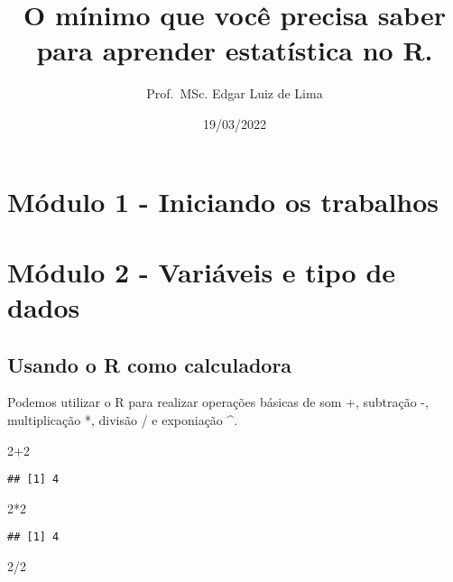 \documentclass[
]{article}
\title{O mínimo que você precisa saber para aprender estatística no R.}
\author{Prof.~MSc. Edgar Luiz de Lima}
\date{19/03/2022}
\newenvironment{Shaded}{\begin{snugshade}}{\end{snugshade}}
\newcommand{\DecValTok}[1]{\textcolor[rgb]{0.00,0.00,0.81}{#1}}
\newcommand{\SpecialCharTok}[1]{\textcolor[rgb]{0.00,0.00,0.00}{#1}}
\begin{document}
\maketitle

\hypertarget{muxf3dulo-1---iniciando-os-trabalhos}{%
\section{Módulo 1 - Iniciando os
trabalhos}\label{muxf3dulo-1---iniciando-os-trabalhos}}

\hypertarget{muxf3dulo-2---variuxe1veis-e-tipo-de-dados}{%
\section{Módulo 2 - Variáveis e tipo de
dados}\label{muxf3dulo-2---variuxe1veis-e-tipo-de-dados}}

\hypertarget{usando-o-r-como-calculadora}{%
\subsection{Usando o R como
calculadora}\label{usando-o-r-como-calculadora}}

Podemos utilizar o R para realizar operações básicas de som +, subtração
-, multiplicação *, divisão / e exponiação \^{}.

\begin{Shaded}
\begin{Highlighting}[]
\DecValTok{2}\SpecialCharTok{+}\DecValTok{2}
\end{Highlighting}
\end{Shaded}

\begin{verbatim}
## [1] 4
\end{verbatim}

\begin{Shaded}
\begin{Highlighting}[]
\DecValTok{2}\SpecialCharTok{*}\DecValTok{2}
\end{Highlighting}
\end{Shaded}

\begin{verbatim}
## [1] 4
\end{verbatim}

\begin{Shaded}
\begin{Highlighting}[]
\DecValTok{2}\SpecialCharTok{/}\DecValTok{2}
\end{Highlighting}
\end{Shaded}
\end{document}
